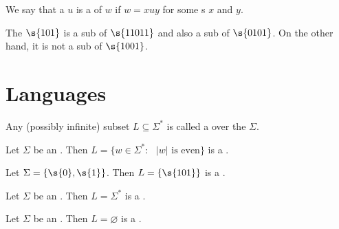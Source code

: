 \begin{flex}
\begin{definition}[Substring] \label{definition:Substring}
We say that a  $u$ is a  of  $w$ if $w = xuy$ for some s $x$ and $y$.
\end{definition}

\begin{example}[$101$ as a substring] \label{example:101-as-a-substring}
The  $\s{101}$ is a sub of $\s{11011}$ and also a sub of $\s{0101}$. 
On the other hand, it is not a sub of $\s{1001}$.
\end{example}
\end{flex}




\section{Languages}
\label{section:Languages}


\begin{flex}
\begin{definition}[Language] \label{definition:Language}
Any (possibly infinite) subset $L \subseteq \Sigma^*$ is called a  over the  $\Sigma$.
\end{definition}

\begin{example} \label{example:Language-of-even-length-strings}
Let $\Sigma$ be an .
Then $L = \{w \in \Sigma^* : \text{ $|w|$ is even}\}$ is a .
\end{example}

\begin{example} \label{example:A-language-with-one-word}
Let $\Sigma = \{\s{0},\s{1}\}$.
Then $L = \{\s{101}\}$ is a .
\end{example}

\begin{example} \label{example:Sigma-as-a-language}
Let $\Sigma$ be an .
Then $L = \Sigma^*$ is a .
\end{example}

\begin{example} \label{example:Empty-set-as-a-language}
Let $\Sigma$ be an .
Then $L = \varnothing$ is a .
\end{example}
\end{flex}


